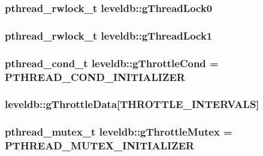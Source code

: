 \subsubsection[{g\+Thread\+Lock0}]{\setlength{\rightskip}{0pt plus 5cm}pthread\+\_\+rwlock\+\_\+t leveldb\+::g\+Thread\+Lock0}\label{namespaceleveldb_a2663d2a0f893e7b99a6a70d095c9c817}
\hypertarget{namespaceleveldb_a05937ca7e46b15b3ffaa538731c504c7}{}
\subsubsection[{g\+Thread\+Lock1}]{\setlength{\rightskip}{0pt plus 5cm}pthread\+\_\+rwlock\+\_\+t leveldb\+::g\+Thread\+Lock1}\label{namespaceleveldb_a05937ca7e46b15b3ffaa538731c504c7}
\hypertarget{namespaceleveldb_a108ce3552e85648b1e14569098a4e10c}{}
\subsubsection[{g\+Throttle\+Cond}]{\setlength{\rightskip}{0pt plus 5cm}pthread\+\_\+cond\+\_\+t leveldb\+::g\+Throttle\+Cond = P\+T\+H\+R\+E\+A\+D\+\_\+\+C\+O\+N\+D\+\_\+\+I\+N\+I\+T\+I\+A\+L\+I\+Z\+E\+R}\label{namespaceleveldb_a108ce3552e85648b1e14569098a4e10c}
\hypertarget{namespaceleveldb_ae106f97bf9649a1107156a56a1abf45d}{}
\subsubsection[{g\+Throttle\+Data}]{ leveldb\+::g\+Throttle\+Data\mbox{[}{\bf T\+H\+R\+O\+T\+T\+L\+E\+\_\+\+I\+N\+T\+E\+R\+V\+A\+L\+S}\mbox{]}}\label{namespaceleveldb_ae106f97bf9649a1107156a56a1abf45d}
\hypertarget{namespaceleveldb_ad319fe0238582e12b35184408caa8d84}{}
\subsubsection[{g\+Throttle\+Mutex}]{\setlength{\rightskip}{0pt plus 5cm}pthread\+\_\+mutex\+\_\+t leveldb\+::g\+Throttle\+Mutex = P\+T\+H\+R\+E\+A\+D\+\_\+\+M\+U\+T\+E\+X\+\_\+\+I\+N\+I\+T\+I\+A\+L\+I\+Z\+E\+R}\label{namespaceleveldb_ad319fe0238582e12b35184408caa8d84}
\hypertarget{namespaceleveldb_a70f24d9eb7f5dbcf2a645e9b0d107c57}{}
